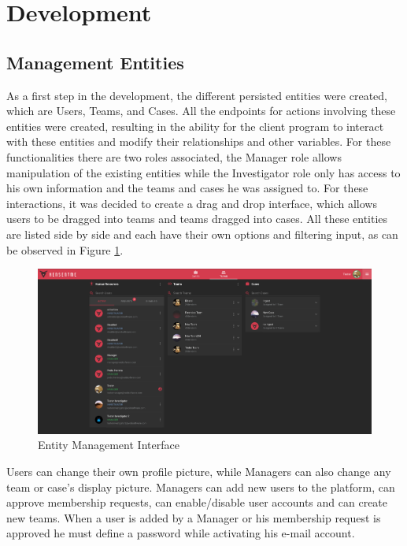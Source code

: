 \section{Development}

\subsection{Management Entities}

As a first step in the development, the different persisted entities were created, which are Users, Teams, and Cases. All the endpoints for actions involving these 
entities were created, resulting in the ability for the client program to interact with these entities and modify their relationships and other variables.
For these functionalities there are two roles associated, the Manager role allows manipulation of the existing entities while the Investigator role only has access to his
own information and the teams and cases he was assigned to. For these interactions, it was decided to create a drag and drop interface, which allows users to be dragged into
teams and teams dragged into cases. All these entities are listed side by side and each have their own options and filtering input, as can be observed in Figure \ref{fig:users}.

\begin{figure}[h]
 \centering
 \includegraphics[width=1\linewidth]{imgs/users.png}
 \caption{Entity Management Interface}
 \label{fig:users}
\end{figure}

Users can change their own profile picture, while Managers can also change any team or case's display picture.
Managers can add new users to the platform, can approve membership requests, can enable/disable user accounts and can create new teams.
When a user is added by a Manager or his membership request is approved he must define a password while activating his e-mail account.

